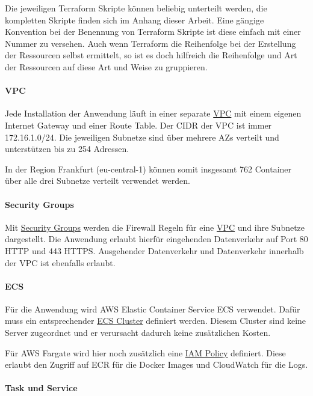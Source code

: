 Die jeweiligen Terraform Skripte können beliebig unterteilt werden, die kompletten Skripte finden sich im Anhang dieser Arbeit.
Eine gängige Konvention bei der Benennung von Terraform Skripte ist diese einfach mit einer Nummer zu versehen.
Auch wenn Terraform die Reihenfolge bei der Erstellung der Ressourcen selbst ermittelt, so ist es doch hilfreich die Reihenfolge und Art der Ressourcen auf diese Art und Weise zu gruppieren.

\paragraph{VPC}

Jede Installation der Anwendung läuft in einer separate \hyperref[lst:terraform_vpc]{VPC} mit einem eigenen Internet Gateway und einer Route Table.
Der CIDR der VPC ist immer 172.16.1.0/24.
Die jeweiligen Subnetze sind über mehrere AZs verteilt und unterstützen bis zu 254 Adressen.

In der Region Frankfurt (eu-central-1) können somit insgesamt 762 Container über alle drei Subnetze verteilt verwendet werden.

\paragraph{Security Groups}

Mit \hyperref[lst:terraform_security_group]{Security Groups} werden die Firewall Regeln für eine \hyperref[lst:terraform_vpc]{VPC} und ihre Subnetze dargestellt.
Die Anwendung erlaubt hierfür eingehenden Datenverkehr auf Port 80 HTTP und 443 HTTPS.
Ausgehender Datenverkehr und Datenverkehr innerhalb der VPC ist ebenfalls erlaubt.

\paragraph{ECS}

Für die Anwendung wird AWS Elastic Container Service ECS verwendet.
Dafür muss ein entsprechender \hyperref[lst:terraform_ecs]{ECS Cluster} definiert werden.
Diesem Cluster sind keine Server zugeordnet und er verursacht dadurch keine zusätzlichen Kosten.

Für AWS Fargate wird hier noch zusätzlich eine \hyperref[lst:terraform_fargate_role_policy]{IAM Policy} definiert.
Diese erlaubt den Zugriff auf ECR für die Docker Images und CloudWatch für die Logs.


\paragraph{Task und Service}

